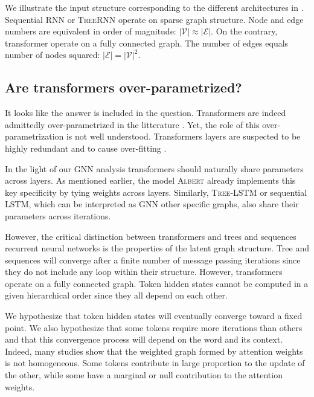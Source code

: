 We illustrate the input structure corresponding to the different architectures in .
Sequential \textsc{RNN} or \textsc{TreeRNN} operate on sparse graph structure. Node and edge numbers are equivalent in order of magnitude: $|\mathcal{V}| \approx |\mathcal{E}|$. On the contrary, transformer operate on a fully connected graph. The number of edges equals number of nodes squared: $|\mathcal{E}| = |\mathcal{V}|^2$.

\subsection{Are transformers over-parametrized?}


It looks like the answer is included in the question. 
Transformers are indeed admittedly over-parametrized in the litterature \parencite{chen_20, hou_20, voita_19}. 
Yet, the role of this over-parametrization is not well understood. 
Transformers layers are suspected to be highly redundant \parencite{liu_20} and to cause over-fitting \parencite{fan_20, zhou_20b}. 

In the light of our GNN analysis transformers should naturally share parameters across layers. As mentioned earlier, the model \textsc{Albert} \parencite{lan_20} already implements this key specificity by tying weights across layers. Similarly, \textsc{Tree-LSTM} or sequential \textsc{LSTM}, which can be interpreted as GNN other specific graphs, also share their parameters across iterations.

However, the critical distinction between transformers and trees and sequences recurrent neural networks is the properties of the latent graph structure. Tree and sequences will converge after a finite number of message passing iterations since they do not include any loop within their structure. However, transformers operate on a fully connected graph. Token hidden states cannot be computed in a given hierarchical order since they all depend on each other.

We hypothesize that token hidden states will eventually converge toward a fixed point. We also hypothesize that some tokens require more iterations than others and that this convergence process will depend on the word and its context. Indeed, many studies show that the weighted graph formed by attention weights is not homogeneous. Some tokens contribute in large proportion to the update of the other, while some have a marginal or null contribution to the attention weights.

